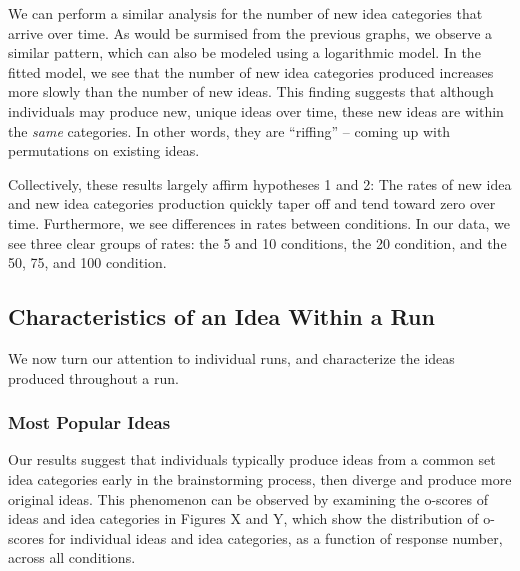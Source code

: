 We can perform a similar analysis for the number of new idea categories that arrive over time. As would be surmised from the previous graphs, we observe a similar pattern, which can also be modeled using a logarithmic model. In the fitted model, we see that the number of new idea categories produced increases more slowly than the number of new ideas. This finding suggests that although individuals may produce new, unique ideas over time, these new ideas are within the \emph{same} categories. In other words, they are ``riffing'' -- coming up with permutations on existing ideas.

Collectively, these results largely affirm hypotheses 1 and 2: The rates of new idea and new idea categories production quickly taper off and tend toward zero over time. Furthermore, we see differences in rates between conditions. In our data, we see three clear groups of rates: the 5 and 10 conditions, the 20 condition, and the 50, 75, and 100 condition.



\subsection{Characteristics of an Idea Within a Run}
We now turn our attention to individual runs, and characterize the ideas produced throughout a run.

\subsubsection{Most Popular Ideas}
Our results suggest that individuals typically produce ideas from a common set idea categories early in the brainstorming process, then diverge and produce more original ideas. This phenomenon can be observed by examining the o-scores of ideas and idea categories in Figures X and Y, which show the distribution of o-scores for individual ideas and idea categories, as a function of response number, across all conditions.

